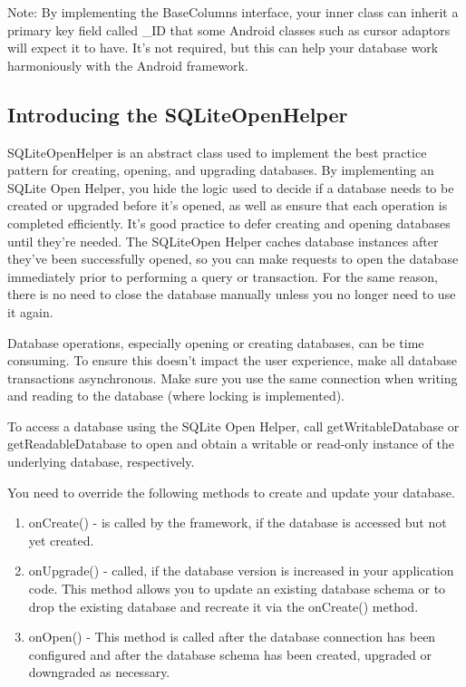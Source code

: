 Note: By implementing the BaseColumns interface, your inner class can inherit a primary key field called \_ID that some Android classes such as cursor adaptors will expect it to have. It's not required, but this can help your database work harmoniously with the Android framework.


\subsection{Introducing the SQLiteOpenHelper}
SQLiteOpenHelper is an abstract class used to implement the best practice pattern for creating, opening, and upgrading databases. By implementing an SQLite Open Helper, you hide the logic used to decide if a database needs to be created or upgraded before it’s opened, as well as ensure that each operation is completed efficiently. It’s good practice to defer creating and opening databases until they’re needed. The SQLiteOpen Helper caches database instances after they’ve been successfully opened, so you can make requests to open the database immediately prior to performing a query or transaction. For the same reason, there is no need to close the database manually unless you no longer need to use it again.

\begin{framed}
	Database operations, especially opening or creating databases, can be time consuming. To ensure this doesn’t impact the user experience, make all database transactions asynchronous. Make sure you use the same connection when writing and reading to the database (where locking is implemented).
\end{framed}

To access a database using the SQLite Open Helper, call getWritableDatabase or getReadableDatabase to open and obtain a writable or read-only instance of the underlying database, respectively.

You need to override the following methods to create and update your database.
\begin{enumerate}
	\item onCreate() - is called by the framework, if the database is accessed but not yet created.
	\item onUpgrade() - called, if the database version is increased in your application code. This method allows you to update an existing database schema or to drop the existing database and recreate it via the onCreate() method.
	\item  onOpen() - This method is called after the database connection has been configured and after the database schema has been created, upgraded or downgraded as necessary.
\end{enumerate}


